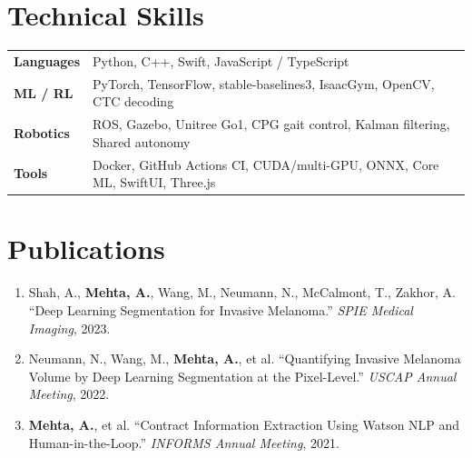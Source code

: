 \documentclass[10pt]{article}
\begin{document}
\section*{Technical Skills}
\begin{tabular}{@{}p{0.9in}l}
\textbf{Languages} & Python, C++, Swift, JavaScript / TypeScript \\
\textbf{ML / RL} & PyTorch, TensorFlow, stable-baselines3, IsaacGym, OpenCV, CTC decoding \\
\textbf{Robotics} & ROS, Gazebo, Unitree Go1, CPG gait control, Kalman filtering, Shared autonomy \\
\textbf{Tools} & Docker, GitHub Actions CI, CUDA/multi-GPU, ONNX, Core ML, SwiftUI, Three.js \\
\end{tabular}

\section*{Publications}
\begin{enumerate}[leftmargin=1.4em,itemsep=1pt,topsep=1pt]
\item Shah, A., \textbf{Mehta, A.}, Wang, M., Neumann, N., McCalmont, T., Zakhor, A. ``Deep Learning Segmentation for Invasive Melanoma.'' \textit{SPIE Medical Imaging}, 2023.
\item Neumann, N., Wang, M., \textbf{Mehta, A.}, et al. ``Quantifying Invasive Melanoma Volume by Deep Learning Segmentation at the Pixel-Level.'' \textit{USCAP Annual Meeting}, 2022.
\item \textbf{Mehta, A.}, et al. ``Contract Information Extraction Using Watson NLP and Human-in-the-Loop.'' \textit{INFORMS Annual Meeting}, 2021.
\end{enumerate}
\end{document}

